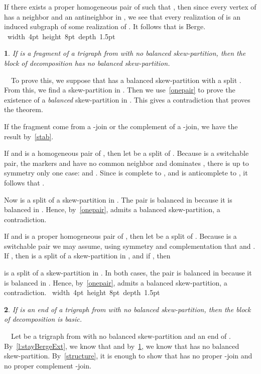 \documentclass[11 pt] {article}
\newcommand\blackslug{\hbox{\hskip 1pt \vrule width 4pt height 8pt depth 1.5pt
        \hskip 1pt}}
\newcommand\bbox{\hfill \quad \blackslug \medbreak}
\newtheorem{theorem}{}[section]
\newcounter{claim}
\newcommand{\Proof}{\setcounter{claim}{0}\noindent{\bf Proof.}\ \ }
\begin{document}
If there exists a proper homogeneous pair  of  such that , then since every vertex of  has a
neighbor and an antineighbor in , we see that every realization of
 is an induced subgraph of some realization of . It follows
that  is Berge.  \bbox

\begin{theorem}\label{stabExt}
  If  is a fragment of a trigraph  from  with no
  balanced skew-partition, then the block of decomposition  has
  no balanced skew-partition.
\end{theorem}

\Proof To prove this, we suppose that  has a balanced skew-partition  with a split .  From this,
we find a skew-partition in .  Then we use~\ref{onepair} to prove
the existence of a \emph{balanced} skew-partition in .  This gives
a contradiction that proves the theorem.

If the fragment come from a -join or the complement of a -join,
we have the result by~\ref{stab}.

If  and  is a homogeneous
pair of , then  let  be a split of .
Because  is a switchable pair, the markers  and  have no
common neighbor and  dominates , there is up to symmetry only
one case:  and . Since  is complete to
, and  is anticomplete to , it follows that .

Now  is a split of a skew-partition  in
. The pair  is balanced in  because it is balanced
in .  Hence, by~\ref{onepair},  admits a balanced skew-partition, a contradiction.

If 
 and  is a proper homogeneous pair
of , then  let  be a split of .  
Because  is a switchable pair we may assume, using symmetry and
complementation that  and . If , then 
is a split of a skew-partition in , and if  , then

is a split of a skew-partition in .  In both cases, the pair
 is balanced in  because it is balanced in .
Hence, by~\ref{onepair},  admits a balanced skew-partition, a
contradiction. \bbox


\begin{theorem} 
 \label{l:extreme}
 If  is an end of a trigraph  from  with no balanced
 skew-partition, then the block of decomposition  is basic.
\end{theorem}

\Proof Let  be a trigraph from  with no balanced
skew-partition and  an end of . By~\ref{l:stayBergeExt}, we know
that  and by~\ref{stabExt}, we know that  has no
balanced skew-partition. By~\ref{structure}, it is enough to show that
 has no proper -join and no proper complement -join.
\end{document}
